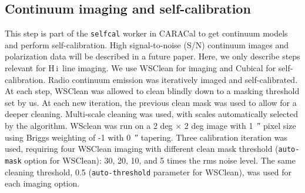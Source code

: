 \documentclass{aa}
\newcommand{\HI}{H\,{\sc i}}
\begin{document}
\subsection{Continuum imaging and self-calibration}
This step is part of the \texttt{selfcal} worker in CARACal to get continuum models and perform self-calibration. High signal-to-noise (S/N) continuum images 
and polarization data will be described in a future paper. Here, we only describe steps relevant for \HI\ line imaging. We use WSClean \citep{2014MNRAS.444..606O} 
for imaging and Cubical \citep{2018MNRAS.478.2399K} for self-calibration. Radio continuum emission was iteratively imaged and self-calibrated. At each step, WSClean 
was allowed to clean blindly down to a 
masking threshold set by us. At each new iteration, the previous clean mask was used to allow for a deeper cleaning. Multi-scale cleaning was used, with scales 
automatically selected by the algorithm. WSclean was run on a 2 deg $\times$ 2 deg image with \SI{1}{\arcsecond} pixel size using Briggs weighting of -1 with \SI{0}{\arcsecond} tapering.  
Three calibration iteration was used, requiring four WSClean imaging with different clean mask threshold (\texttt{auto-mask} option for WSClean): 30, 20, 10, 
and 5 times the rms noise level. The same cleaning threshold, 0.5 (\texttt{auto-threshold} parameter for WSClean),  was used for each imaging option.     
\end{document}
